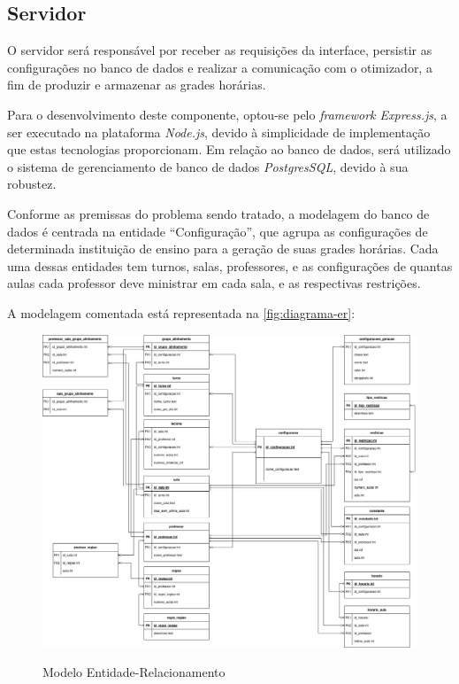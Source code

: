 \subsection{Servidor}
O servidor será responsável por receber as requisições da interface, persistir as configurações no banco de dados e realizar a comunicação com o otimizador, a fim de produzir e armazenar as grades horárias.

Para o desenvolvimento deste componente, optou-se pelo \textit{framework Express.js}, a ser executado na plataforma \textit{Node.js}, devido à simplicidade de implementação que estas tecnologias proporcionam. Em relação ao banco de dados, será utilizado o sistema de gerenciamento de banco de dados \textit{PostgresSQL}, devido à sua robustez.

Conforme as premissas do problema sendo tratado, a modelagem do banco de dados é centrada na entidade ``Configuração'', que agrupa as configurações de determinada instituição de ensino para a geração de suas grades horárias. Cada uma dessas entidades tem turnos, salas, professores, e as configurações de quantas aulas cada professor deve ministrar em cada sala, e as respectivas restrições.

A modelagem comentada está representada na \autoref{fig:diagrama-er}:

\begin{figure}[!htb]
	\centering
	\caption{Modelo Entidade-Relacionamento}
	\includegraphics[width=1\textwidth]{./dados/figuras/diagrama_er}
	\label{fig:diagrama-er}
\end{figure}
\newpage

